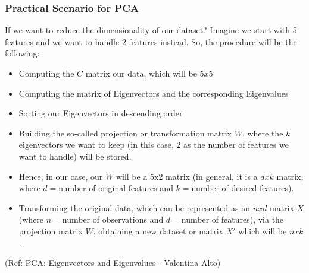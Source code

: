 \begin{frame}[fragile] \frametitle{Practical Scenario for PCA} 

If we want to reduce the dimensionality of our dataset? Imagine we start with 5 features and we want to handle 2 features instead. So, the procedure will be the following:

\begin{itemize}
\item Computing the $C$ matrix our data, which will be $5x5$
\item Computing the matrix of Eigenvectors and the corresponding Eigenvalues
\item Sorting our Eigenvectors in descending order
\item Building the so-called projection or transformation matrix $W$, where the $k$ eigenvectors we want to keep (in this case, 2 as the number of features we want to handle) will be stored. 
\item Hence, in our case, our $W$ will be a 5x2 matrix (in general, it is a $dxk$ matrix, where $d=$number of original features and $k=$number of desired features).
\item Transforming the original data, which can be represented as an $nxd$ matrix $X$ (where $n=$number of observations and $d=$number of features), via the projection matrix $W$, obtaining a new dataset or matrix $X'$ which will be $nxk$.
\end{itemize}

{\tiny (Ref: PCA: Eigenvectors and Eigenvalues - Valentina Alto)}

\end{frame}




